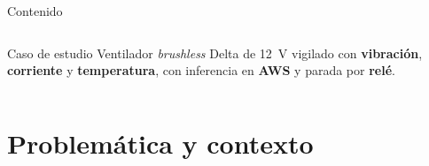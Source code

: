 \documentclass[aspectratio=169]{beamer}
\newcommand{\dato}[1]{{\color{verdeosc}\textbf{#1}}}
\begin{document}
\begin{frame}{Contenido}
  \begin{columns}[T]
    \tableofcontents
    \vspace{0.3cm}
    \begin{block}{Caso de estudio}
      \footnotesize
      Ventilador \textit{brushless} Delta de 12~V vigilado con
      \dato{vibración}, \dato{corriente} y \dato{temperatura}, con inferencia en
      \dato{AWS} y parada por \dato{relé}.
    \end{block}
  \end{columns}
\end{frame}

\section{Problemática y contexto}
\end{document}
